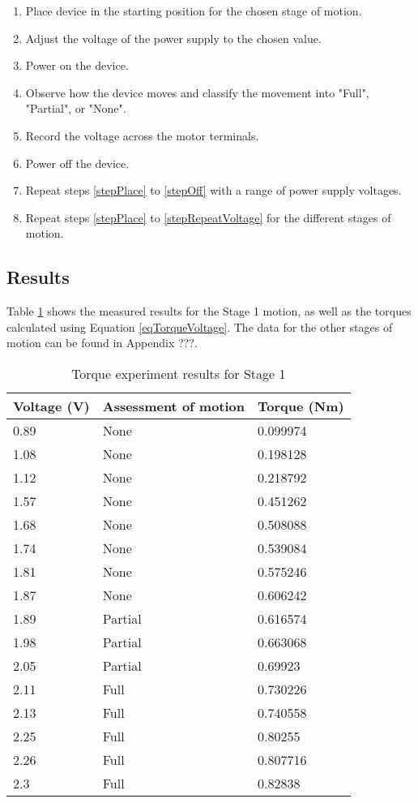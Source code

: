 \begin{enumerate}
	\item Place device in the starting position for the chosen stage of motion. \label{stepPlace}
	\item Adjust the voltage of the power supply to the chosen value.
	\item Power on the device.
	\item Observe how the device moves and classify the movement into "Full", "Partial", or "None". 
	\item Record the voltage across the motor terminals. 
	\item Power off the device.\label{stepOff}
	\item Repeat steps \ref{stepPlace} to \ref{stepOff} with a range of power supply voltages.\label{stepRepeatVoltage}
	\item Repeat steps \ref{stepPlace} to \ref{stepRepeatVoltage} for the different stages of motion.
\end{enumerate}

\subsection{Results}

Table \ref{tableStage1Torque} shows the measured results for the Stage 1 motion, as well as the torques calculated using Equation \ref{eqTorqueVoltage}. The data for the other stages of motion can be found in Appendix ???.

\begin{table}[!h]
	\caption{Torque experiment results for Stage 1}
	\label{tableStage1Torque}
	\centering
	\begin{tabular}{|l|l|l|}
		\hline
		Voltage (V) & Assessment of motion & Torque (Nm) \\ \hline
		0.89 & None & 0.099974 \\ \hline
		1.08 & None & 0.198128 \\ \hline
		1.12 & None & 0.218792 \\ \hline
		1.57 & None & 0.451262 \\ \hline
		1.68 & None & 0.508088 \\ \hline
		1.74 & None & 0.539084 \\ \hline
		1.81 & None & 0.575246 \\ \hline
		1.87 & None & 0.606242 \\ \hline
		1.89 & Partial & 0.616574 \\ \hline
		1.98 & Partial & 0.663068 \\ \hline
		2.05 & Partial & 0.69923 \\ \hline
		2.11 & Full & 0.730226 \\ \hline
		2.13 & Full & 0.740558 \\ \hline
		2.25 & Full & 0.80255 \\ \hline
		2.26 & Full & 0.807716 \\ \hline
		2.3 & Full & 0.82838 \\ \hline
	\end{tabular}
\end{table}

